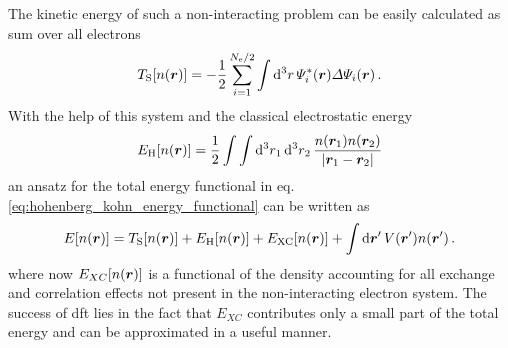 \documentclass[main.tex]{subfiles}
\begin{document}
The kinetic energy of such a non-interacting problem can be easily calculated as sum over all electrons
\begin{equation}
    T_{\mathrm{S}} [n(\vb*{r})] = - \frac{1}{2} \sum_{i=1}^{N_{\mathrm{e}} / 2} \int \dd[3]{r} \Psi_i^* (\vb*{r}) \Delta \Psi_i (\vb*{r})\,.
\end{equation}
With the help of this system and the classical electrostatic energy 
\begin{equation}
    E_{\mathrm{H}} [n(\vb*{r})] = \frac{1}{2} \int \int \dd[3]{r_1} \dd[3]{r_2} \frac{n(\vb*{r}_1) n(\vb*{r}_2)}{\vert \vb*{r}_1 - \vb*{r}_2 \vert}
\end{equation}
an ansatz for the total energy functional in eq. \ref{eq:hohenberg_kohn_energy_functional} can be written as
\begin{equation}
    E[n(\vb*{r})] = T_{\mathrm{S}} [n(\vb*{r})] + E_{\mathrm{H}} [n(\vb*{r})] + E_{\mathrm{XC}} [n(\vb*{r})] + \int \dd{\vb*{r}^{\prime}} V(\vb*{r}^{\prime}) n (\vb*{r}^{\prime})\,.
\end{equation}
where now \(E_{XC} [n(\vb*{r})]\) is a functional of the density accounting for all exchange and correlation effects not present in the non-interacting electron system.
The success of \acrshort{dft} lies in the fact that \(E_{XC}\) contributes only a small part of the total energy and can be approximated in a useful manner. 
\end{document}
